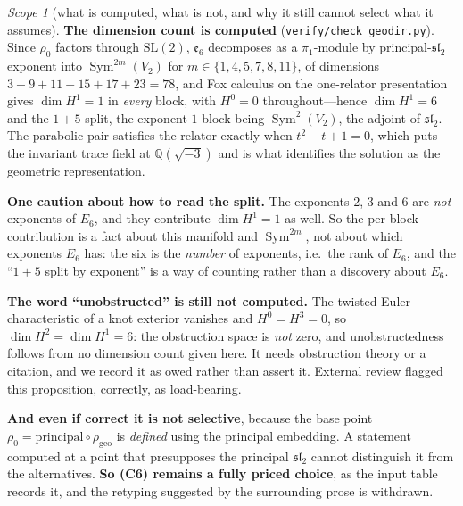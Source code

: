\documentclass[11pt,reqno]{amsart}
\theoremstyle{plain}
\theoremstyle{definition}
\theoremstyle{remark}
\newtheorem{scope}[theorem]{Scope}
\newcommand{\Q}{\mathbb{Q}}
\newcommand{\SL}{\mathrm{SL}}
\newcommand{\sll}{\mathfrak{sl}}
\newcommand{\ee}{\mathfrak{e}}
\newcommand{\Sym}{\operatorname{Sym}}
\newcommand{\fn}[1]{\texttt{\small #1}}
\begin{document}
\begin{scope}[what is computed, what is not, and why it still cannot select what it
assumes]\label{sc:geodirscope}
\textbf{The dimension count is computed} (\fn{verify/check\_\allowbreak geodir.py}).
Since $\rho_0$ factors through $\SL(2)$, $\ee_6$ decomposes as a $\pi_1$-module by
principal-$\sll_2$ exponent into $\Sym^{2m}(V_2)$ for $m\in\{1,4,5,7,8,11\}$, of
dimensions $3+9+11+15+17+23=78$, and Fox calculus on the one-relator presentation gives
$\dim H^1=1$ in \emph{every} block, with $H^0=0$ throughout---hence $\dim H^1=6$ and the
$1+5$ split, the exponent-$1$ block being $\Sym^2(V_2)$, the adjoint of $\sll_2$. The
parabolic pair satisfies the relator exactly when $t^2-t+1=0$, which puts the invariant trace field
at $\Q(\sqrt{-3})$ and is what identifies the solution as the geometric representation.

\textbf{One caution about how to read the split.} The exponents $2$, $3$ and $6$ are
\emph{not} exponents of $E_6$, and they contribute $\dim H^1=1$ as well. So the per-block
contribution is a fact about this manifold and $\Sym^{2m}$, not about which exponents
$E_6$ has: the six is the \emph{number} of exponents, i.e.\ the rank of $E_6$, and the
``$1+5$ split by exponent'' is a way of counting rather than a discovery about $E_6$.

\textbf{The word ``unobstructed'' is still not computed.} The twisted Euler
characteristic of a knot exterior vanishes and $H^0=H^3=0$, so $\dim H^2=\dim H^1=6$: the
obstruction space is \emph{not} zero, and unobstructedness follows from no dimension count
given here. It needs obstruction theory or a citation, and we record it as owed rather
than assert it. External review flagged this proposition, correctly, as load-bearing.

\textbf{And even if correct it is not selective}, because the base point
$\rho_0=\text{principal}\circ\rho_{\mathrm{geo}}$ is \emph{defined} using the principal
embedding. A statement computed at a point that presupposes the principal $\sll_2$ cannot
distinguish it from the alternatives. \textbf{So (C6) remains a fully priced choice}, as the
input table records it, and the retyping suggested by the surrounding prose is withdrawn.
\end{scope}
\end{document}
